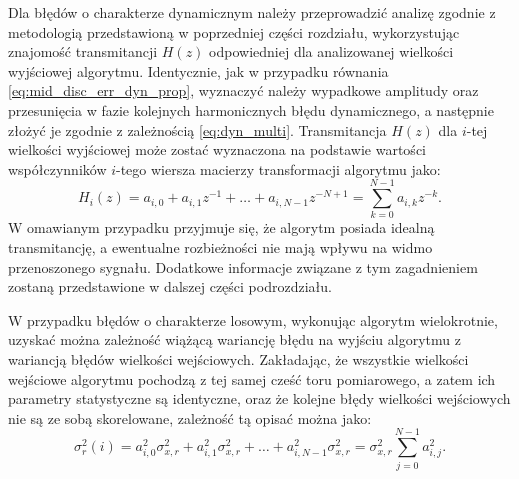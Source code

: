 Dla błędów o charakterze dynamicznym należy przeprowadzić analizę zgodnie z metodologią przedstawioną w poprzedniej części rozdziału, wykorzystując znajomość transmitancji $H(z)$ odpowiedniej dla analizowanej wielkości wyjściowej algorytmu. Identycznie, jak w przypadku równania \eqref{eq:mid_disc_err_dyn_prop}, wyznaczyć należy wypadkowe amplitudy oraz przesunięcia w fazie kolejnych harmonicznych błędu dynamicznego, a następnie złożyć je zgodnie z zależnością \eqref{eq:dyn_multi}. Transmitancja $H(z)$ dla $i$-tej wielkości wyjściowej może zostać wyznaczona na podstawie wartości współczynników $i$-tego wiersza macierzy transformacji algorytmu jako:
\begin{equation}
H_{i} \left( z \right) = a_{i, 0} + a_{i, 1} z^{-1} + \hdots + a_{i, N-1} z^{-N+1} = \sum _{k = 0} ^{N-1} a_{i, k} z^{-k} \label{eq:alg_trans_single}.
\end{equation}
W omawianym przypadku przyjmuje się, że algorytm posiada idealną transmitancję, a ewentualne rozbieżności nie mają wpływu na widmo przenoszonego sygnału. Dodatkowe informacje związane z tym zagadnieniem zostaną przedstawione w dalszej części podrozdziału.

W przypadku błędów o charakterze losowym, wykonując algorytm wielokrotnie, uzyskać można zależność wiążącą wariancję błędu na wyjściu algorytmu z wariancją błędów wielkości wejściowych. Zakładając, że wszystkie wielkości wejściowe algorytmu pochodzą z tej samej cześć toru pomiarowego, a zatem ich parametry statystyczne są identyczne, oraz że kolejne błędy wielkości wejściowych nie są ze sobą skorelowane, zależność tą opisać można jako:
\begin{equation}
\sigma_{r}^{2} \left( i \right) = a_{i, 0}^{2} \sigma_{x,r}^{2} + a_{i, 1}^{2} \sigma_{x,r}^{2} + \hdots + a_{i, N-1}^{2} \sigma_{x,r}^{2} = \sigma_{x,r}^{2} \sum _{j=0} ^{N-1} {a_{i, j}^{2}} \label{eq:alg_outvar_rand}.
\end{equation}

